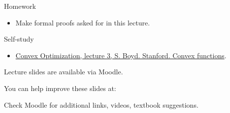 \documentclass{beamer}
\begin{document}
\begin{frame}{Homework}
\begin{flushleft}

\begin{itemize}
    \item Make formal proofs asked for in this lecture.
\end{itemize}

\end{flushleft}
\end{frame}


\begin{frame}{Self-study}
\begin{flushleft}

\begin{itemize}
    \item \href{https://www.youtube.com/watch?v=kcOodzDGV4c}{Convex Optimization, lecture 3, S. Boyd. Stanford. Convex functions}.
\end{itemize}

\end{flushleft}
\end{frame}



\begin{frame}
	\centerline{Lecture slides are available via Moodle.}
	\bigskip
	\centerline{You can help improve these slides at:}
	\centerline{
		\mygit
	}
	\bigskip
	
	\textcolor{black}{}
	\bigskip
	
	
	\centerline{Check Moodle for additional links, videos, textbook suggestions.}
\end{frame}
\end{document}
